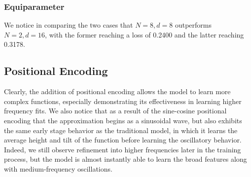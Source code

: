 \documentclass[11pt]{article}
\begin{document}
\subsubsection{Equiparameter}
We notice in comparing the two cases that $N = 8, d = 8$ outperforms $N = 2, d = 16$, with the former reaching a loss of 0.2400 and the latter reaching 0.3178.

\subsection{Positional Encoding}
Clearly, the addition of positional encoding allows the model to learn more complex functions, especially demonstrating its effectiveness in learning higher frequency fits. We also notice that as a result of the sine-cosine positional encoding that the approximation begins as a sinusoidal wave, but also exhibits the same early stage behavior as the traditional model, in which it learns the average height and tilt of the function before learning the oscillatory behavior. Indeed, we still observe refinement into higher frequencies later in the training process, but the model is almost instantly able to learn the broad features along with medium-frequency oscillations.
\end{document}
